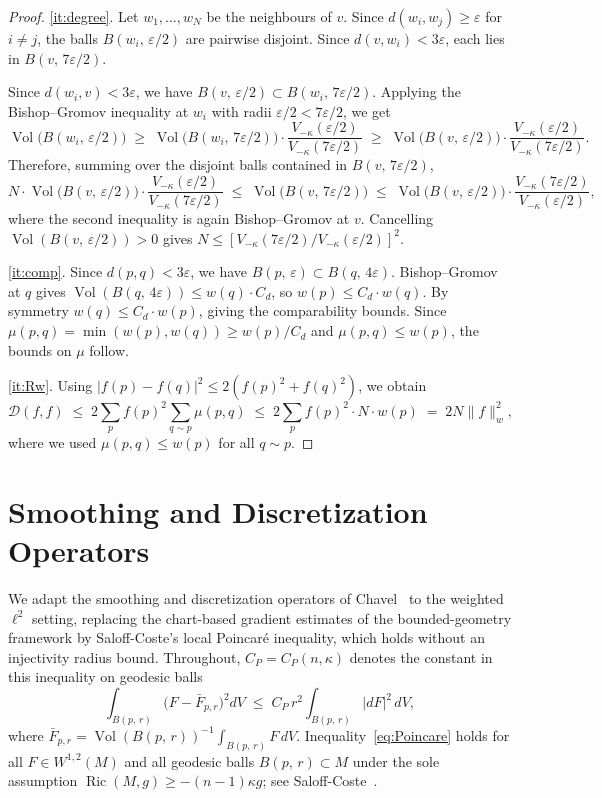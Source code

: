 \documentclass[10pt,reqno]{amsart}
\theoremstyle{remark}
\newcommand{\Ric}{\operatorname{Ric}}
\newcommand{\Vol}{\operatorname{Vol}}
\newcommand{\normw}[1]{\lVert #1 \rVert_{w}}
\newcommand{\DD}{\mathcal{D}}
\newcommand{\Vk}{V_{-\kappa}}
\newcommand{\B}[2]{B(#1,\,#2)}
\begin{document}
\begin{proof}
\ref{it:degree}.
Let $w_1,\ldots,w_N$ be the neighbours of $v$.
Since $d(w_i,w_j)\geq\varepsilon$ for $i\neq j$, the balls
$\B{w_i}{\varepsilon/2}$ are pairwise disjoint.
Since $d(v,w_i)<3\varepsilon$, each lies in $\B{v}{7\varepsilon/2}$.


Since $d(w_i,v)<3\varepsilon$, we have
$\B{v}{\varepsilon/2}\subset\B{w_i}{7\varepsilon/2}$. Applying the Bishop--Gromov inequality at $w_i$ with radii
$\varepsilon/2 < 7\varepsilon/2$, we get
\[
  \Vol\!\bigl(\B{w_i}{\varepsilon/2}\bigr)
  \;\geq\;
  \Vol\!\bigl(\B{w_i}{7\varepsilon/2}\bigr)
  \cdot\frac{\Vk(\varepsilon/2)}{\Vk(7\varepsilon/2)}
  \;\geq\;
  \Vol\!\bigl(\B{v}{\varepsilon/2}\bigr)
  \cdot\frac{\Vk(\varepsilon/2)}{\Vk(7\varepsilon/2)}.
\]
Therefore, summing over the disjoint balls contained in $\B{v}{7\varepsilon/2}$,
\[
  N\cdot\Vol\!\bigl(\B{v}{\varepsilon/2}\bigr)
  \cdot\frac{\Vk(\varepsilon/2)}{\Vk(7\varepsilon/2)}
  \;\leq\;
  \Vol\!\bigl(\B{v}{7\varepsilon/2}\bigr)
  \;\leq\;
  \Vol\!\bigl(\B{v}{\varepsilon/2}\bigr)
  \cdot\frac{\Vk(7\varepsilon/2)}{\Vk(\varepsilon/2)},
\]
where the second inequality is again Bishop--Gromov at $v$.
Cancelling $\Vol(\B{v}{\varepsilon/2})>0$ gives
$N\leq[\Vk(7\varepsilon/2)/\Vk(\varepsilon/2)]^2$.

\ref{it:comp}.
Since $d(p,q)<3\varepsilon$, we have
$\B{p}{\varepsilon}\subset\B{q}{4\varepsilon}$.
Bishop--Gromov at $q$ gives
$\Vol(\B{q}{4\varepsilon})\leq w(q)\cdot C_d$,
so $w(p)\leq C_d\cdot w(q)$.
By symmetry $w(q)\leq C_d\cdot w(p)$, giving the comparability bounds.
Since $\mu(p,q)=\min(w(p),w(q))\geq w(p)/C_d$ and
$\mu(p,q)\leq w(p)$, the bounds on $\mu$ follow.

\ref{it:Rw}.
Using $|f(p)-f(q)|^2\leq 2(f(p)^2+f(q)^2)$, we obtain
\[
  \DD(f,f)
  \;\leq\;
  2\sum_p f(p)^2\sum_{q\sim p}\mu(p,q)
  \;\leq\;
  2\sum_p f(p)^2\cdot N\cdot w(p)
  \;=\;
  2N\normw{f}^2,
\]
where we used $\mu(p,q)\leq w(p)$ for all $q\sim p$.
\end{proof}

\section{Smoothing and Discretization Operators}
\label{sec:operators}

We adapt the smoothing and discretization operators of
Chavel~\cite{Chavel2001} to the weighted $\ell^2$ setting, replacing
the chart-based gradient estimates of the bounded-geometry framework
by Saloff-Coste's local Poincar\'e inequality, which holds without an
injectivity radius bound. Throughout, $C_P=C_P(n,\kappa)$ denotes the
constant in this inequality on geodesic balls
\begin{equation}
\label{eq:Poincare}
  \int_{\B{p}{r}}\!\bigl(F-\bar{F}_{p,r}\bigr)^2 dV
  \;\leq\;
  C_P\,r^2\!\int_{\B{p}{r}}\!|dF|^2\,dV,
\end{equation}
where $\bar{F}_{p,r}=\Vol(\B{p}{r})^{-1}\int_{\B{p}{r}}F\,dV$.
Inequality~\eqref{eq:Poincare} holds for all $F\in W^{1,2}(M)$ and all
geodesic balls $\B{p}{r}\subset M$ under the sole assumption
$\Ric(M,g)\geq-(n-1)\kappa g$; see Saloff-Coste~\cite{SaloffCoste1992}.
\end{document}
